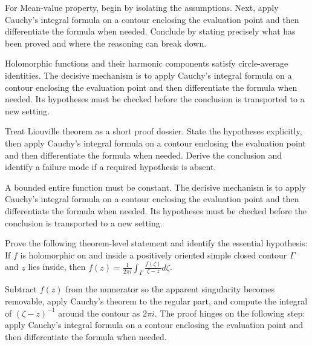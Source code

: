 \begin{problem}\label{prob:iv06-problem-06}
For Mean-value property, begin by isolating the assumptions. Next, apply Cauchy's integral formula on a contour enclosing the evaluation point and then differentiate the formula when needed. Conclude by stating precisely what has been proved and where the reasoning can break down.
\end{problem}
\begin{solution}
Holomorphic functions and their harmonic components satisfy circle-average identities. The decisive mechanism is to apply Cauchy's integral formula on a contour enclosing the evaluation point and then differentiate the formula when needed. Its hypotheses must be checked before the conclusion is transported to a new setting.
\end{solution}

\begin{problem}\label{prob:iv06-problem-07}
Treat Liouville theorem as a short proof dossier. State the hypotheses explicitly, then apply Cauchy's integral formula on a contour enclosing the evaluation point and then differentiate the formula when needed. Derive the conclusion and identify a failure mode if a required hypothesis is absent.
\end{problem}
\begin{solution}
A bounded entire function must be constant. The decisive mechanism is to apply Cauchy's integral formula on a contour enclosing the evaluation point and then differentiate the formula when needed. Its hypotheses must be checked before the conclusion is transported to a new setting.
\end{solution}

\begin{problem}\label{prob:iv06-problem-08}
Prove the following theorem-level statement and identify the essential hypothesis: If $f$ is holomorphic on and inside a positively oriented simple closed contour $\Gamma$ and $z$ lies inside, then $f(z)=\frac1{2\pi i}\int_\Gamma\frac{f(\zeta)}{\zeta-z}d\zeta$.
\end{problem}
\begin{solution}
Subtract $f(z)$ from the numerator so the apparent singularity becomes removable, apply Cauchy's theorem to the regular part, and compute the integral of $(\zeta-z)^{-1}$ around the contour as $2\pi i$. The proof hinges on the following step: apply Cauchy's integral formula on a contour enclosing the evaluation point and then differentiate the formula when needed.
\end{solution}

